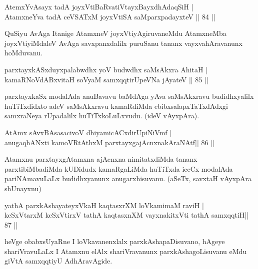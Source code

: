 \begin{shl}
AtemxYvAsayx tadA joyxVtiBaRvatiVtayxBayxdhAdaqSiH | \\
AtamxneYva tadA ceVSATxM joyxVtiSA saMparxpadayxteV \hfill||  84 ||  
\end{shl}

\begin{artha}
QuSiyu AvAga Itanige AtamxneV joyxVtiyAgiruvaneMdu AtamxneMba joyxVtiyiMdaleV AvAga savxpanxdalilx puruSanu tananx vayxvahAravanunx hoMduvanu.
\end{artha}


\begin{shl}
parxtayxkASxduyxpalabwdhx yoV budwdhx saMsAkxra AhitaH | \\
kamaRNoVdABxvitaH soV\s yaM samxqqtirUpeVNa jAyateV \hfill||  85 ||  
\end{shl}

\begin{artha}
parxtayxkaSx modalAda anuBavavu baMdAga yAva saMsAkxravu budidhxyalilx huTiTxdidxto adeV saMsAkxravu kamaRdiMda ebibxsalapxTaTxdAdxgi samxraNeya rUpadalilx huTiTxkoLuLxvudu. (ideV vAyxpAra).
\end{artha}


\begin{shl}
AtAmx sAvxBAsasacivoV dhiyamicACxdirUpiNiVmf | \\
anugaqhANxti kamoVRtAthxM parxtayxgajAcnxnakAraNAtf\hfill ||  86 ||  
\end{shl}

\begin{artha}
Atamxnu parxtayxgAtamxna ajAcnxna nimitatxdiMda tananx parxtibiMbadiMda kUDidudx kamaRgaLiMda huTiTxda iceCx modalAda pariNAmavuLaLx budidhxyanunx anugarxhisuvanu. (aSeTx, savxtaH vAyxpAra shUnayxnu)
\end{artha}


\begin{shl}
yathA parxkAshayateyxVkaH kaqtasxrXM loVkamimaM raviH | \\
keSxVtarxM keSxVtirxV tathA kaqtasxnXM vayxnakitxVti tathA samxqqtiH\hfill ||  87 ||  
\end{shl}

\begin{artha}
heVge obabxsUyaRne I loVkavanenxlalx parxkAshapaDisuvano, hAgeye shariVravuLaLx I Atamxnu elAlx shariVravanunx parxkAshagoLisuvanu eMdu giVtA samxqqtiyU AdhAravAgide.
\end{artha}

